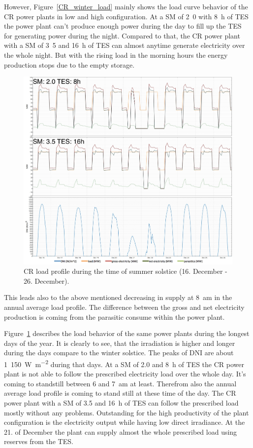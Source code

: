 However, Figure~\ref{CR_winter_load} mainly shows the load curve behavior of the CR power plants in low and high configuration. At a SM of \si{2.0} with \SI{8}{h} of TES the power plant can't produce enough power during the day to fill up the TES for generating power during the night. Compared to that, the CR power plant with a SM of \si{3.5} and \SI{16}{h} of TES can almost anytime generate electricity over the whole night. But with the rising load in the morning hours the energy production stops due to the empty storage. 
\begin{figure}[htbp]  
\centering
\includegraphics[width=1\linewidth]{FIG/CR_summer_load}
\caption[CR load profile during the time of summer solstice (16. December - 26. December).]{CR load profile during the time of summer solstice (16. December - 26. December).}\label{CR_summer_load}
\end{figure}
This leads also to the above mentioned decreasing in supply at \SI{8}{am} in the annual average load profile. The difference between the gross and net electricity production is coming from the parasitic consume within the power plant.

Figure~\ref{CR_summer_load} describes the load behavior of the  same power plants during the longest days of the year. It is clearly to see, that the irradiation is higher and longer during the days compare to the winter solstice. The peaks of DNI are about 1~\SI{150}{\watt\per\square\metre} during that days. At a SM of 2.0 and \SI{8}{h} of TES the CR power plant is not able to follow the prescribed electricity load over the whole day. It's coming to standstill between 6 and \SI{7}{am} at least. Therefrom also the annual average load profile is coming to stand still at these time of the day. The CR power plant with a SM of 3.5 and \SI{16}{h} of TES can follow the prescribed load mostly without any problems. Outstanding for the high productivity of the plant configuration is the electricity output while having low direct irradiance. At the 21. of December the plant can supply almost the whole prescribed load using reserves from the TES.

